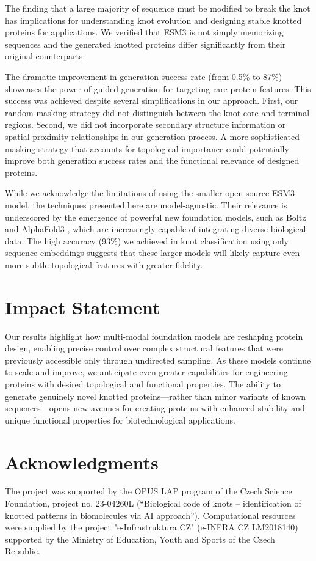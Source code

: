 \documentclass{article}
\theoremstyle{plain}
\theoremstyle{definition}
\theoremstyle{remark}
\begin{document}
The finding that a large majority of sequence must be modified to break the knot has implications for understanding knot evolution and designing stable knotted proteins for applications. We verified that ESM3 is not simply memorizing sequences and the generated knotted proteins differ significantly from their original counterparts.

The dramatic improvement in generation success rate (from 0.5\% to 87\%) showcases the power of guided generation for targeting rare protein features. This success was achieved despite several simplifications in our approach. First, our random masking strategy did not distinguish between the knot core and terminal regions. Second, we did not incorporate secondary structure information or spatial proximity relationships in our generation process. A more sophisticated masking strategy that accounts for topological importance could potentially improve both generation success rates and the functional relevance of designed proteins.

While we acknowledge the limitations of using the smaller open-source ESM3 model, the techniques presented here are model-agnostic. Their relevance is underscored by the emergence of powerful new foundation models, such as Boltz \citep{wohlwend2024boltz} and AlphaFold3 \citep{abramson2024accurate}, which are increasingly capable of integrating diverse biological data. The high accuracy (93\%) we achieved in knot classification using only sequence embeddings suggests that these larger models will likely capture even more subtle topological features with greater fidelity.

\section*{Impact Statement}

Our results highlight how multi-modal foundation models are reshaping protein design, enabling precise control over complex structural features that were previously accessible only through undirected sampling. As these models continue to scale and improve, we anticipate even greater capabilities for engineering proteins with desired topological and functional properties. The ability to generate genuinely novel knotted proteins—rather than minor variants of known sequences—opens new avenues for creating proteins with enhanced stability and unique functional properties for biotechnological applications.

\section*{Acknowledgments}
The project was supported by the OPUS LAP program of the Czech Science Foundation, project no. 23-04260L (“Biological code of knots – identification of knotted patterns in biomolecules via AI approach”). Computational resources were supplied by the project "e-Infrastruktura CZ" (e-INFRA CZ LM2018140) supported by the Ministry of Education, Youth and Sports of the Czech Republic.



\end{document}

